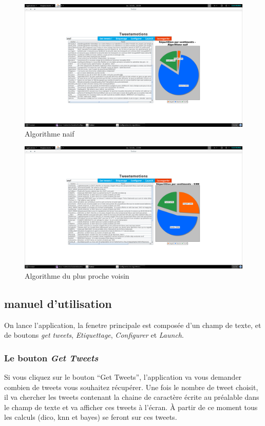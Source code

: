 \documentclass[a4paper,10pt]{report}
\begin{document}
      \begin{figure}[H]
	\centering
	\includegraphics[scale=0.2]{impressions-ecran/dico.png}
	\caption{Algorithme naif}
	\label{dico}
      \end{figure}
      \begin{figure}[H]
	\centering
	\includegraphics[scale=0.2]{impressions-ecran/KNN.png}
	\caption{Algorithme du plus proche voisin}
	\label{KNN}
      \end{figure}


    
    \subsection{manuel d'utilisation}
      On lance l'application, la fenetre principale est composée d'un champ de texte, et de boutons \textit{get tweets}, \textit{Etiquettage}, \textit{Configurer} et 
      \textit{Launch}.
      \subsubsection{Le bouton \textit{Get Tweets}}
	Si vous cliquez sur le bouton ``Get Tweets'', l'application va vous demander combien de tweets vous souhaitez récupérer. Une fois le nombre de tweet choisit,
	il va chercher les tweets contenant la chaine de caractère écrite au préalable dans le champ de texte et va afficher ces tweets à l'écran.
	À partir de ce moment tous les calculs (dico, knn et bayes) se feront sur ces tweets.
\end{document}
